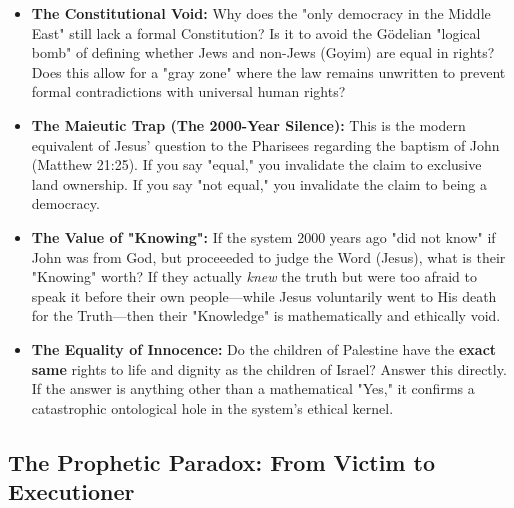 \documentclass[11pt,a4paper]{article}
\theoremstyle{definition}
\theoremstyle{remark}
\begin{document}
\begin{itemize}
    \item \textbf{The Constitutional Void:} Why does the "only democracy in the Middle East" still lack a formal Constitution? Is it to avoid the G\"odelian "logical bomb" of defining whether Jews and non-Jews (Goyim) are equal in rights? Does this allow for a "gray zone" where the law remains unwritten to prevent formal contradictions with universal human rights?
    
    \item \textbf{The Maieutic Trap (The 2000-Year Silence):} This is the modern equivalent of Jesus’ question to the Pharisees regarding the baptism of John (Matthew 21:25). If you say "equal," you invalidate the claim to exclusive land ownership. If you say "not equal," you invalidate the claim to being a democracy. 
    
    \item \textbf{The Value of "Knowing":} If the system 2000 years ago "did not know" if John was from God, but proceeeded to judge the Word (Jesus), what is their "Knowing" worth? If they actually \textit{knew} the truth but were too afraid to speak it before their own people—while Jesus voluntarily went to His death for the Truth—then their "Knowledge" is mathematically and ethically void. 
    
    \item \textbf{The Equality of Innocence:} Do the children of Palestine have the \textbf{exact same} rights to life and dignity as the children of Israel? Answer this directly. If the answer is anything other than a mathematical "Yes," it confirms a catastrophic ontological hole in the system's ethical kernel.
\end{itemize}

\subsection{The Prophetic Paradox: From Victim to Executioner}
\end{document}
